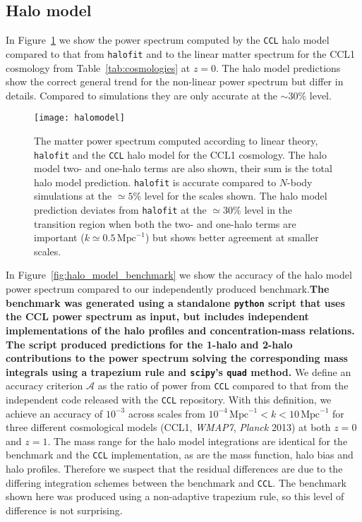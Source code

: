 \documentclass[\docopts]{\docclass}
\newcommand{\ccl}{{\tt CCL}\xspace}
\newcommand{\halofit}{{\tt halofit}\xspace}
\begin{document}
\subsection{Halo model}
\label{sec:halo_model_verification}

In Figure~\ref{fig:halo_model} we show the power spectrum computed by the \ccl halo model compared to that from \halofit and to the linear matter spectrum for the CCL1 cosmology from Table~\ref{tab:cosmologies} at $z=0$. The halo model predictions show the correct general trend for the non-linear power spectrum but differ in details. Compared to simulations they are only accurate at the $\sim 30\%$ level.

\begin{figure}
\texttt{[image: halomodel]}
\caption{The matter power spectrum computed according to linear theory, \halofit and the \ccl halo model for the CCL1 cosmology. The halo model two- and one-halo terms are also shown, their sum is the total halo model prediction. \halofit is accurate compared to $N$-body simulations at the $\simeq5\%$ level for the scales shown. The halo model prediction deviates from \halofit at the $\simeq30\%$ level in the transition region when both the two- and one-halo terms are important ($k\simeq0.5\,\mathrm{Mpc}^{-1}$) but shows better agreement at smaller scales.}
\label{fig:halo_model}
\end{figure}

In Figure~\ref{fig:halo_model_benchmark} we show the accuracy of the halo model power spectrum compared to our independently produced benchmark.{\bf The benchmark was generated using a standalone {\tt python} script that uses the CCL power spectrum as input, but includes independent implementations of the halo profiles and concentration-mass relations. The script produced predictions for the 1-halo and 2-halo contributions to the power spectrum solving the corresponding mass integrals using a trapezium rule and {\tt scipy}'s {\tt quad} method.} We define an accuracy criterion $\mathcal{A}$ as the ratio of power from \ccl compared to that from the independent code released with the \ccl repository. With this definition, we achieve an accuracy of $10^{-3}$ across scales from $10^{-4}\,\mathrm{Mpc}^{-1}<k<10\,\mathrm{Mpc}^{-1}$ for three different cosmological models (CCL1, {\it WMAP7}, {\it Planck} 2013) at both $z=0$ and $z=1$. The mass range for the halo model integrations are identical for the benchmark and the \ccl implementation, as are the mass function, halo bias and halo profiles. Therefore we suspect that the residual differences are due to the differing integration schemes between the benchmark and \ccl. The benchmark shown here was produced using a non-adaptive trapezium rule, so this level of difference is not surprising.
\end{document}
